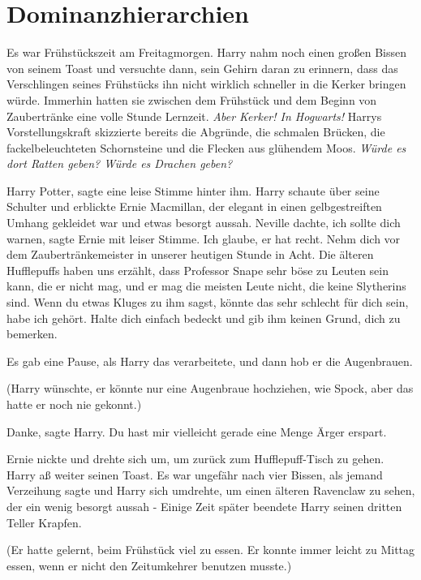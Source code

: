 \chapter{Dominanzhierarchien}

Es war Frühstückszeit am Freitagmorgen. Harry nahm noch einen
großen Bissen von seinem Toast und versuchte dann, sein Gehirn daran zu
erinnern, dass das Verschlingen seines Frühstücks ihn nicht wirklich schneller
in die Kerker bringen würde. Immerhin hatten sie zwischen dem Frühstück und dem
Beginn von Zaubertränke eine volle Stunde Lernzeit. \emph{Aber Kerker! In
Hogwarts!} Harrys Vorstellungskraft skizzierte bereits die Abgründe, die
schmalen Brücken, die fackelbeleuchteten Schornsteine und die Flecken aus
glühendem Moos. \emph{Würde es dort Ratten geben? Würde es Drachen geben?}

\glqq{}Harry Potter\grqq{}, sagte eine leise Stimme hinter ihm. Harry schaute
über seine Schulter und erblickte Ernie Macmillan, der elegant in einen
gelbgestreiften Umhang gekleidet war und etwas besorgt aussah. \glqq{}Neville
dachte, ich sollte dich warnen\grqq{}, sagte Ernie mit leiser Stimme. \glqq{}Ich
glaube, er hat recht. Nehm dich vor dem Zaubertränkemeister in unserer heutigen
Stunde in Acht. Die älteren Hufflepuffs haben uns erzählt, dass Professor Snape
sehr böse zu Leuten sein kann, die er nicht mag, und er mag die meisten Leute
nicht, die keine Slytherins sind. Wenn du etwas Kluges zu ihm sagst, könnte das
sehr schlecht für dich sein, habe ich gehört. Halte dich einfach bedeckt und gib
ihm keinen Grund, dich zu bemerken.\grqq{}

Es gab eine Pause, als Harry das verarbeitete, und dann hob er die Augenbrauen.

(Harry wünschte, er könnte nur eine Augenbraue hochziehen, wie Spock, aber das
hatte er noch nie gekonnt.)

\glqq{}Danke\grqq{}, sagte Harry. \glqq{}Du hast mir vielleicht gerade eine Menge
Ärger erspart.\grqq{}

Ernie nickte und drehte sich um, um zurück zum Hufflepuff-Tisch zu gehen. Harry
aß weiter seinen Toast. Es war ungefähr nach vier Bissen, als jemand \glqq{}
Verzeihung\grqq{} sagte und Harry sich umdrehte, um einen älteren Ravenclaw zu
sehen, der ein wenig besorgt aussah - Einige Zeit später beendete Harry seinen
dritten Teller Krapfen.

(Er hatte gelernt, beim Frühstück viel zu essen. Er konnte immer leicht zu
Mittag essen, wenn er nicht den Zeitumkehrer benutzen musste.)

